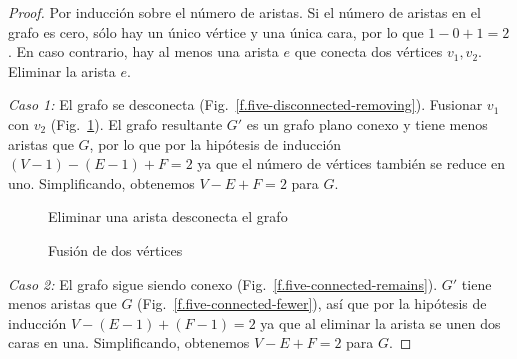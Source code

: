 \begin{proof}
Por inducción sobre el número de aristas. Si el número de aristas en el grafo es cero, sólo hay un único vértice y una única cara, por lo que $1-0+1=2$. En caso contrario, hay al menos una arista $e$ que conecta dos vértices $v_1,v_2$. Eliminar la arista $e$.

\textit{Caso 1:}
El grafo se desconecta (Fig.~\ref{f.five-disconnected-removing}). Fusionar $v_1$ con $v_2$ (Fig.~\ref{f.five-disconnected-merge}). El grafo resultante $G'$ es un grafo plano conexo y tiene menos aristas que $G$, por lo que por la hipótesis de inducción $(V-1)-(E-1)+F=2$ ya que el número de vértices también se reduce en uno. Simplificando, obtenemos $V-E+F=2$ para $G$.

\begin{figure}[t]
\begin{minipage}{.45\textwidth}
\begin{center}
\caption{Eliminar una arista desconecta el grafo}\label{f.five-disconnected-removing}
\end{center}
\end{minipage}
\hfill
\begin{minipage}{.45\textwidth}
\begin{center}
\caption{Fusión de dos vértices}\label{f.five-disconnected-merge}
\end{center}
\end{minipage}
\end{figure}

\textit{Caso 2:}
El grafo sigue siendo conexo (Fig.~\ref{f.five-connected-remains}). $G'$ tiene menos aristas que $G$ (Fig.~\ref{f.five-connected-fewer}), así que por la hipótesis de inducción $V-(E-1)+(F-1)=2$ ya que al eliminar la arista se unen dos caras en una. Simplificando, obtenemos $V-E+F=2$ para $G$.
\end{proof}

